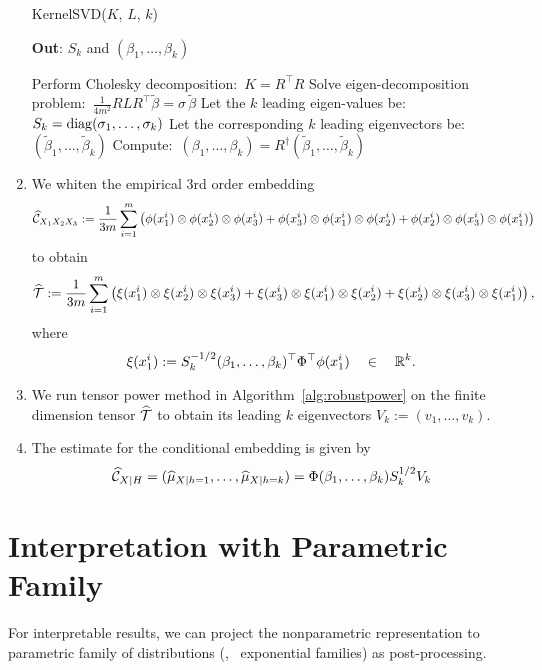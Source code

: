 \documentclass[11pt]{article}
\begin{document}
\begin{enumerate}
\begin{algorithm}[t!]
\caption{KernelSVD($K$, $L$, $k$)}
	\textbf{Out}: $S_k$ and $(\beta_1,\ldots,\beta_k)$\\[-0.4cm]
  \begin{algorithmic}[1]
    \STATE Perform Cholesky decomposition:\ $K=R^\top R$
    \STATE Solve eigen-decomposition problem:\ $\frac{1}{4m^2} R L R^\top \widetilde{\beta} = \sigma\,\widetilde{\beta}$
    \STATE Let the $k$ leading eigen-values be:\ $S_k = \mathop{\mathrm{diag}}(\sigma_1,\ldots,\sigma_k)$
    \STATE Let the corresponding $k$ leading eigenvectors be:\ $(\widetilde{\beta}_1,\ldots,\widetilde{\beta}_k)$
    \STATE Compute:\ $(\beta_1,\ldots,\beta_k) = R^\dagger (\widetilde{\beta}_1,\ldots,\widetilde{\beta}_k)$
  \end{algorithmic}
  \label{alg:svd}
\end{algorithm}

\item We whiten the empirical 3rd order embedding 
$$
  \widehat {\mathcal{C}}_{X_1 X_2 X_3}:=\frac{1}{3m}\sum_{i=1}^{m} \left(\phi(x_1^i) \otimes \phi(x_2^i) \otimes \phi(x_3^i) + \phi(x_3^i) \otimes \phi(x_1^i) \otimes \phi(x_2^i) + \phi(x_2^i) \otimes \phi(x_3^i) \otimes \phi(x_1^i)\right)
$$ 
to obtain
\begin{align}
  \widehat {{\mathcal{T}}} := \frac{1}{3m}\sum_{i=1}^m \left(\xi(x_1^i) \otimes \xi(x_2^i) \otimes \xi(x_3^i) + \xi(x_3^i) \otimes \xi(x_1^i) \otimes \xi(x_2^i) + \xi(x_2^i) \otimes \xi(x_3^i) \otimes \xi(x_1^i)\right),
\end{align}
where
$$
	\xi(x_1^i) := S_k^{-1/2} (\beta_1,\ldots,\beta_k)^\top \Phi^\top \phi(x_1^i)\quad \in \quad \mathbb{R}^k.
$$

\item We run tensor power method in Algorithm~\ref{alg:robustpower} on the finite dimension tensor $\widehat {{\mathcal{T}}}$ to obtain its leading $k$ eigenvectors $V_k:=(v_1,\ldots,v_k)$. 

\item The estimate for the conditional embedding is given by
\begin{align}
  \widehat {\mathcal{C}}_{X|H} = (\widehat \mu_{X|h=1},\ldots, \widehat \mu_{X|h=k}) = \Phi (\beta_1,\ldots,\beta_k) S_k^{1/2} V_k
\end{align}

\end{enumerate}

\section{Interpretation with Parametric Family}

For interpretable results, we can project the nonparametric representation to parametric family of distributions (\eg, \, exponential families) as post-processing.




\end{document}
